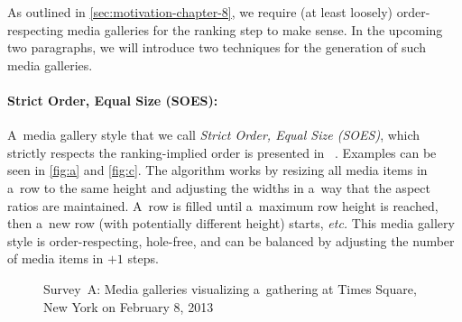 As outlined in \autoref{sec:motivation-chapter-8},
we require (at least loosely) order-respecting media galleries
for the ranking step to make sense.
In the upcoming two paragraphs, we will introduce two techniques
for the generation of such media galleries.

\paragraph{Strict Order, Equal Size (SOES):}

A~media gallery style that we call \emph{Strict Order, Equal Size (SOES)},
which strictly respects the ranking-implied order is presented in~%
\cite{chedeau2012googleplus}.
Examples can be seen in \autoref{fig:a} and \autoref{fig:c}.
The algorithm works by resizing all media items in a~row to the same height
and adjusting the widths in a~way that the aspect ratios are maintained.
A~row is filled until a~maximum row height is reached,
then a~new row (with potentially different height) starts, \emph{etc.}
This media gallery style is order-respecting, hole-free,
and can be balanced by adjusting the number
of media items in $+1$ steps.

\begin{figure}[!ht]
  \centering
  \caption[Survey~A: Media galleries visualizing a~gathering at Times Square]{Survey~A: Media galleries visualizing a~gathering at Times Square, New York on February 8, 2013}
  \label{fig:media-gallery1}  
\end{figure}

